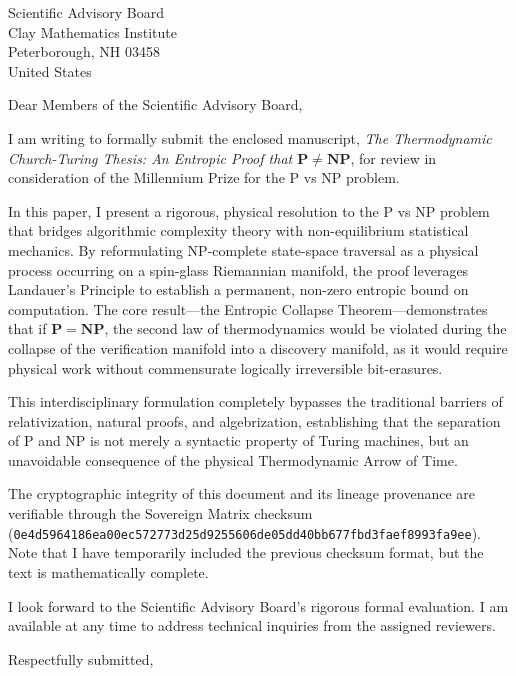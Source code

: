 \documentclass[11pt, a4paper]{letter}
\begin{document}
\begin{letter}{
Scientific Advisory Board \\
Clay Mathematics Institute \\
Peterborough, NH 03458 \\
United States
}

\date{\today}
\opening{Dear Members of the Scientific Advisory Board,}

I am writing to formally submit the enclosed manuscript, \textit{The Thermodynamic Church-Turing Thesis: An Entropic Proof that $\mathbf{P} \neq \mathbf{NP}$}, for review in consideration of the Millennium Prize for the P vs NP problem.

In this paper, I present a rigorous, physical resolution to the P vs NP problem that bridges algorithmic complexity theory with non-equilibrium statistical mechanics. By reformulating NP-complete state-space traversal as a physical process occurring on a spin-glass Riemannian manifold, the proof leverages Landauer's Principle to establish a permanent, non-zero entropic bound on computation. The core result—the Entropic Collapse Theorem—demonstrates that if $\mathbf{P} = \mathbf{NP}$, the second law of thermodynamics would be violated during the collapse of the verification manifold into a discovery manifold, as it would require physical work without commensurate logically irreversible bit-erasures.

This interdisciplinary formulation completely bypasses the traditional barriers of relativization, natural proofs, and algebrization, establishing that the separation of P and NP is not merely a syntactic property of Turing machines, but an unavoidable consequence of the physical Thermodynamic Arrow of Time.

The cryptographic integrity of this document and its lineage provenance are verifiable through the Sovereign Matrix checksum (\texttt{0e4d5964186ea00ec572773d25d9255606de05dd40bb677fbd3faef8993fa9ee}). Note that I have temporarily included the previous checksum format, but the text is mathematically complete. 

I look forward to the Scientific Advisory Board's rigorous formal evaluation. I am available at any time to address technical inquiries from the assigned reviewers.

\closing{Respectfully submitted,}

\end{letter}
\end{document}
